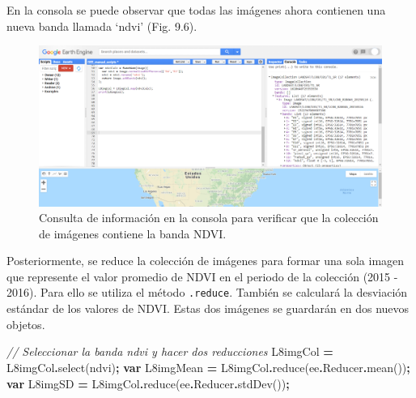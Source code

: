 \documentclass[
  12pt,
  letterpaper,
  twoside]{book}
\newenvironment{Shaded}{\begin{snugshade}}{\end{snugshade}}
\newcommand{\AttributeTok}[1]{\textcolor[rgb]{0.77,0.63,0.00}{#1}}
\newcommand{\CommentTok}[1]{\textcolor[rgb]{0.56,0.35,0.01}{\textit{#1}}}
\newcommand{\FunctionTok}[1]{\textcolor[rgb]{0.00,0.00,0.00}{#1}}
\newcommand{\KeywordTok}[1]{\textcolor[rgb]{0.13,0.29,0.53}{\textbf{#1}}}
\newcommand{\NormalTok}[1]{#1}
\newcommand{\OperatorTok}[1]{\textcolor[rgb]{0.81,0.36,0.00}{\textbf{#1}}}
\newcommand{\StringTok}[1]{\textcolor[rgb]{0.31,0.60,0.02}{#1}}
\begin{document}
En la consola se puede observar que todas las imágenes ahora contienen una nueva banda llamada `ndvi' (Fig. 9.6).

\begin{figure}[btp]

{\centering \includegraphics[width=1\linewidth]{Img/imConNDVI} 

}

\caption{Consulta de información en la consola para verificar que la colección de imágenes contiene la banda NDVI.}\label{fig:unnamed-chunk-161}
\end{figure}

Posteriormente, se reduce la colección de imágenes para formar una sola imagen que represente el valor promedio de NDVI en el periodo de la colección (2015 - 2016). Para ello se utiliza el método \texttt{.reduce}. También se calculará la desviación estándar de los valores de NDVI. Estas dos imágenes se guardarán en dos nuevos objetos.

\begin{Shaded}
\begin{Highlighting}[]
\CommentTok{// Seleccionar la banda ndvi y hacer dos reducciones}
\NormalTok{L8imgCol }\OperatorTok{=}\NormalTok{ L8imgCol}\OperatorTok{.}\FunctionTok{select}\NormalTok{(}\StringTok{\textquotesingle{}ndvi\textquotesingle{}}\NormalTok{)}\OperatorTok{;}
\KeywordTok{var}\NormalTok{ L8imgMean }\OperatorTok{=}\NormalTok{ L8imgCol}\OperatorTok{.}\FunctionTok{reduce}\NormalTok{(ee}\OperatorTok{.}\AttributeTok{Reducer}\OperatorTok{.}\FunctionTok{mean}\NormalTok{())}\OperatorTok{;}
\KeywordTok{var}\NormalTok{ L8imgSD }\OperatorTok{=}\NormalTok{ L8imgCol}\OperatorTok{.}\FunctionTok{reduce}\NormalTok{(ee}\OperatorTok{.}\AttributeTok{Reducer}\OperatorTok{.}\FunctionTok{stdDev}\NormalTok{())}\OperatorTok{;}
\end{Highlighting}
\end{Shaded}
\end{document}

